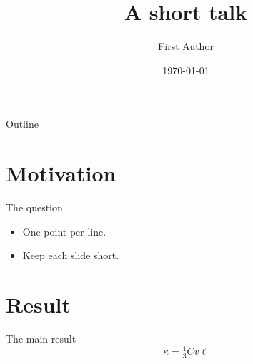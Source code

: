 \documentclass{beamer}
\title{A short talk}
\author{First Author}
\date{\today}
\begin{document}
\begin{frame}
  \titlepage
\end{frame}

\begin{frame}{Outline}
  \tableofcontents
\end{frame}

\section{Motivation}
\begin{frame}{The question}
  \begin{itemize}
    \item One point per line.
    \item Keep each slide short.
  \end{itemize}
\end{frame}

\section{Result}
\begin{frame}{The main result}
  \[ \kappa = \tfrac{1}{3} C v \ell \]
\end{frame}
\end{document}

